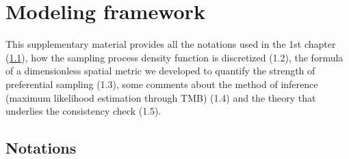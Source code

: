 \section{Modeling framework}\label{appendix:SM1}

This supplementary material provides all the notations used in the 1st chapter (\ref{appendix:notations}), how the sampling process density function is discretized (1.2), the formula of a dimensionless spatial metric we developed to quantify the strength of preferential sampling (1.3), some comments about the method of inference (maximum likelihood estimation through TMB) (1.4) and the theory that underlies the consistency check (1.5).

\subsection{Notations}\label{appendix:notations}

